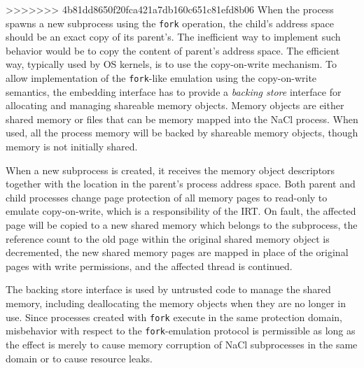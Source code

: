 >>>>>>> 4b81dd8650f20fca421a7db160c651c81efd8b06
When the process spawns a new subprocess using the \lstinline`fork`
operation, the child's address space should be an exact copy of its
parent's.  The inefficient way to implement such behavior would be to
copy the content of parent's address space. The efficient way,
typically used by OS kernels, is to use the copy-on-write mechanism.
To allow implementation of the \lstinline`fork`-like emulation using
the copy-on-write semantics, the embedding interface has to provide a
\emph{backing store} interface for allocating and managing shareable
memory objects. Memory objects are either shared memory or files that
can be memory mapped into the NaCl process. When used, all the process
memory will be backed by shareable memory objects, though memory is
not initially shared.

When a new subprocess is created, it receives the memory object
descriptors together with the location in the parent's process address
space. Both parent and child processes change page protection of all
memory pages to read-only to emulate copy-on-write, which is a
responsibility of the IRT. On fault, the affected page will be copied
to a new shared memory which belongs to the subprocess, the reference
count to the old page within the original shared memory object is
decremented, the new shared memory pages are mapped in place of the
original pages with write permissions, and the affected thread is
continued.

The backing store interface is used by untrusted code to manage the
shared memory, including deallocating the memory objects when they are
no longer in use.  Since processes created with \lstinline`fork`
execute in the same protection domain, misbehavior with respect to the
\lstinline`fork`-emulation protocol is permissible as long as the
effect is merely to cause memory corruption of NaCl subprocesses in
the same domain or to cause resource leaks.


